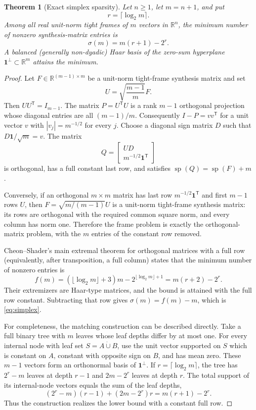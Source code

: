 \documentclass[11pt]{article}
\newtheorem{theorem}{Theorem}
\newcommand{\R}{\mathbb R}
\newcommand{\spn}{\operatorname{sp}}
\begin{document}
\begin{theorem}[Exact simplex sparsity]
Let $n\geq 1$, let $m=n+1$, and put
\[
 r=\lceil\log_2m\rceil.
\]
Among all real unit-norm tight frames of $m$ vectors in $\R^n$, the minimum
number of nonzero synthesis-matrix entries is
\begin{equation}\label{eq:simplex}
 \sigma(m)=m(r+1)-2^r.
\end{equation}
A balanced (generally non-dyadic) Haar basis of the zero-sum hyperplane
$\mathbf 1^\perp\subset\R^m$ attains the minimum.
\end{theorem}

\begin{proof}
Let $F\in\R^{(m-1)\times m}$ be a unit-norm tight-frame synthesis matrix and
set
\[
 U=\sqrt{\frac{m-1}{m}}F.
\]
Then $UU^{\mathsf T}=I_{m-1}$.  The matrix $P=U^{\mathsf T}U$ is a rank
$m-1$ orthogonal projection whose diagonal entries are all $(m-1)/m$.
Consequently $I-P=vv^{\mathsf T}$ for a unit vector $v$ with
$|v_j|=m^{-1/2}$ for every $j$.  Choose a diagonal sign matrix $D$ such that
$D\mathbf 1/\sqrt m=v$.  The matrix
\[
 Q=\begin{bmatrix}UD\\ m^{-1/2}\mathbf 1^{\mathsf T}\end{bmatrix}
\]
is orthogonal, has a full constant last row, and satisfies
$\spn(Q)=\spn(F)+m$.

Conversely, if an orthogonal $m\times m$ matrix has last row
$m^{-1/2}\mathbf 1^{\mathsf T}$ and first $m-1$ rows $U$, then
$F=\sqrt{m/(m-1)}U$ is a unit-norm tight-frame synthesis matrix: its rows are
orthogonal with the required common square norm, and every column has norm
one.  Therefore the frame problem is exactly the orthogonal-matrix problem,
with the $m$ entries of the constant row removed.

Cheon--Shader's main extremal theorem for orthogonal matrices with a full row
(equivalently, after transposition, a full column) states that the minimum
number of nonzero entries is
\begin{equation}\label{eq:cheon}
 f(m)=(\lfloor\log_2m\rfloor+3)m
       -2^{\lfloor\log_2m\rfloor+1}
     =m(r+2)-2^r.
\end{equation}
Their extremizers are Haar-type matrices, and the bound is attained with the
full row constant.  Subtracting that row gives
$\sigma(m)=f(m)-m$, which is \eqref{eq:simplex}.

For completeness, the matching construction can be described directly.
Take a full binary tree with $m$ leaves whose leaf depths differ by at most
one.  For every internal node with leaf set $S=A\mathbin{\dot\cup}B$, use the
unit vector supported on $S$ which is constant on $A$, constant with opposite
sign on $B$, and has mean zero.  These $m-1$ vectors form an orthonormal basis
of $\mathbf 1^\perp$.  If $r=\lceil\log_2m\rceil$, the tree has
$2^r-m$ leaves at depth $r-1$ and $2m-2^r$ leaves at depth $r$.  The total
support of its internal-node vectors equals the sum of the leaf depths,
\[
 (2^r-m)(r-1)+(2m-2^r)r=m(r+1)-2^r.
\]
Thus the construction realizes the lower bound with a constant full row.
\end{proof}
\end{document}
